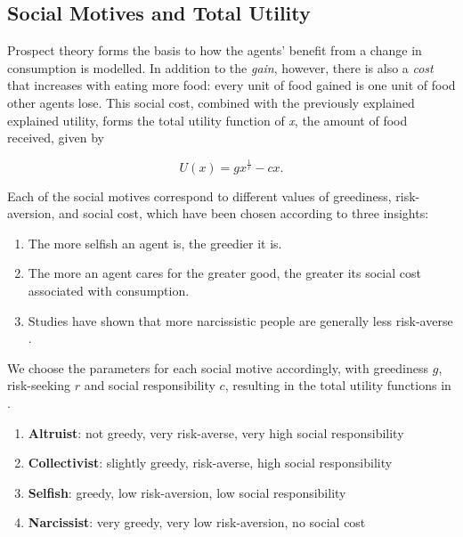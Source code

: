 \subsection{Social Motives and Total Utility}

Prospect theory forms the basis to how the agents' benefit from a change in consumption is modelled. In addition to the \textit{gain}, however, there is also a \textit{cost} that increases with eating more food: every unit of food gained is one unit of food other agents lose. This social cost, combined with the previously explained explained utility, forms the total utility function of \textit{x}, the amount of food received, given by 

\begin{equation}
    U(x)=gx^\frac{1}{r}-cx.
\end{equation}

Each of the social motives correspond to different values of greediness, risk-aversion, and social cost, which have been chosen according to three insights: 
\begin{enumerate}
    \item The more selfish an agent is, the greedier it is.
    
    \item The more an agent cares for the greater good, the greater its social cost associated with consumption.
    
    \item Studies have shown that more narcissistic people are generally less risk-averse \cite{campbell2004narcissism}.
\end{enumerate}

We choose the parameters for each social motive accordingly, with greediness $g$, risk-seeking $r$ and social responsibility $c$, resulting in the total utility functions in .
\begin{enumerate}[label=(\alph*)]
    \item \textbf{Altruist}: not greedy, very risk-averse, very high social responsibility
    
    \item \textbf{Collectivist}: slightly greedy, risk-averse, high social responsibility
    
    \item \textbf{Selfish}: greedy, low risk-aversion, low social responsibility
    
    \item \textbf{Narcissist}: very greedy, very low risk-aversion, no social cost
\end{enumerate}

